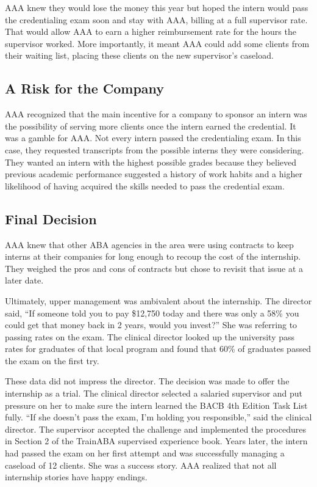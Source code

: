 AAA knew they would lose the money this year but hoped the intern would pass the credentialing exam soon and stay with AAA, billing at a full supervisor rate. That would allow AAA to earn a higher reimbursement rate for the hours the supervisor worked. More importantly, it meant AAA could add some clients from their waiting list, placing these clients on the new supervisor's caseload. 

\subsection{A Risk for the Company}
AAA recognized that the main incentive for a company to sponsor an intern was the possibility of serving more clients once the intern earned the credential. It was a gamble for AAA. Not every intern passed the credentialing exam. In this case, they requested transcripts from the possible interns they were considering. They wanted an intern with the highest possible grades because they believed previous academic performance suggested a history of work habits and a higher likelihood of having acquired the skills needed to pass the credential exam.

\subsection{Final Decision}
AAA knew that other ABA agencies in the area were using contracts to keep interns at their companies for long enough to recoup the cost of the internship. They weighed the pros and cons of contracts but chose to revisit that issue at a later date.

Ultimately, upper management was ambivalent about the internship. The director said, ``If someone told you to pay \$12,750 today and there was only a 58\% you could get that money back in 2 years, would you invest?'' She was referring to passing rates on the exam. The clinical director looked up the university pass rates for graduates of that local program and found that 60\% of graduates passed the exam on the first try. 

These data did not impress the director. The decision was made to offer the internship as a trial. The clinical director selected a salaried supervisor and put pressure on her to make sure the intern learned the BACB\textregistered{} 4th Edition Task List fully. ``If she doesn't pass the exam, I'm holding you responsible,'' said the clinical director. The supervisor accepted the challenge and implemented the procedures in Section 2 of the TrainABA supervised experience book. Years later, the intern had passed the exam on her first attempt and was successfully managing a caseload of 12 clients. She was a success story. AAA realized that not all internship stories have happy endings.



